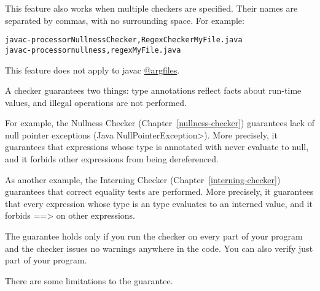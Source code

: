 This feature also works when multiple checkers are specified.
Their names are separated by commas, with no surrounding space.
For example:

\begin{alltt}
  javac -processor NullnessChecker,RegexChecker MyFile.java
  javac -processor nullness,regex MyFile.java
\end{alltt}

This feature does not apply to javac \href{https://docs.oracle.com/javase/7/docs/technotes/tools/windows/javac.html#commandlineargfile}{@argfiles}.



A checker guarantees two things:  type annotations reflect facts about
run-time values, and illegal operations are not performed.

For example, the Nullness Checker (Chapter~\ref{nullness-checker})
guarantees lack of null pointer exceptions (Java \<NullPointerException>).
More precisely, it guarantees
that expressions whose type is annotated with
 never evaluate to null,
and it forbids other expressions from being dereferenced.

As another example, the Interning Checker (Chapter~\ref{interning-checker})
guarantees that correct equality tests are performed.
More precisely, it guarantees that
every expression whose type is an  type
evaluates to an interned value, and it forbids
\<==>  on other expressions.

The guarantee holds only if you run the checker on every part of your
program and the checker issues no warnings anywhere in the code.
You can also verify just part of your program.

There are some limitations to the guarantee.


